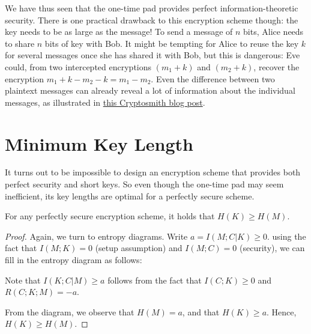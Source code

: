 We have thus seen that the one-time pad provides perfect information-theoretic security. There is one practical drawback to this encryption scheme though: the key needs to be as large as the message! To send a message of $n$ bits, Alice needs to share $n$ bits of key with Bob. It might be tempting for Alice to reuse the key $k$ for several messages once she has shared it with Bob, but this is dangerous: Eve could, from two intercepted encryptions $(m_1 + k)$ and $(m_2 + k)$, recover the encryption $m_1 + k - m_2 - k = m_1 - m_2$. Even the difference between two plaintext messages can already reveal a lot of information about the individual messages, as illustrated in \href{https://cryptosmith.com/2008/05/31/stream-reuse/}{this Cryptosmith blog post}.

\section{Minimum Key Length}
It turns out to be impossible to design an encryption scheme that provides both perfect security and short keys. So even though the one-time pad may seem inefficient, its key lengths are optimal for a perfectly secure scheme.
\begin{theorem}
For any perfectly secure encryption scheme, it holds that $H(K) \geq H(M)$.
\end{theorem}
\begin{proof}
Again, we turn to entropy diagrams. Write $a = I(M;C|K) \geq 0$. using the fact that $I(M;K) = 0$ (setup assumption) and $I(M;C) = 0$ (security), we can fill in the entropy diagram as follows:

\begin{center}
\end{center}
Note that $I(K;C|M) \geq a$ follows from the fact that $I(C;K) \geq 0$ and $R(C;K;M) = -a$.

From the diagram, we observe that $H(M) = a$, and that $H(K) \geq a$. Hence, $H(K) \geq H(M)$.
\end{proof}